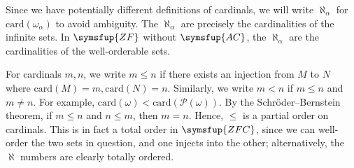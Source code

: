 Since we have potentially different definitions of cardinals, we will write \( \aleph_\alpha \) for \( \mathrm{card}(\omega_\alpha) \) to avoid ambiguity.
The \( \aleph_\alpha \) are precisely the cardinalities of the infinite sets.
In \( \symsfup{ZF} \) without \( \symsfup{AC} \), the \( \aleph_\alpha \) are the cardinalities of the well-orderable sets.

For cardinals \( m, n \), we write \( m \leq n \) if there exists an injection from \( M \) to \( N \) where \( \mathrm{card}(M) = m, \mathrm{card}(N) = n \).
Similarly, we write \( m < n \) if \( m \leq n \) and \( m \neq n \).
For example, \( \mathrm{card}(\omega) < \mathrm{card}(\mathcal P(\omega)) \).
By the Schr\"oder--Bernstein theorem, if \( m \leq n \) and \( n \leq m \), then \( m = n \).
Hence, \( \leq \) is a partial order on cardinals.
This is in fact a total order in \( \symsfup{ZFC} \), since we can well-order the two sets in question, and one injects into the other; alternatively, the \( \aleph \) numbers are clearly totally ordered.

